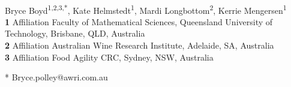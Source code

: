 \documentclass[10pt,letterpaper]{article}
\begin{document}
\vspace*{0.2in}

\begin{flushleft}
{\Large
\textbf{}
}
\newline
\\
Bryce Boyd\textsuperscript{1,2,3,*},
Kate Helmstedt\textsuperscript{1},
Mardi Longbottom\textsuperscript{2},
Kerrie Mengersen\textsuperscript{1}
\\
\bigskip
\textbf{1} Affiliation Faculty of Mathematical Sciences, Queensland University of Technology, Brisbane, QLD, Australia
\\
\textbf{2} Affiliation Australian Wine Research Institute, Adelaide, SA, Australia
\\
\textbf{3} Affiliation Food Agility CRC, Sydney, NSW, Australia
\\
\bigskip

% 
%







* Bryce.polley@awri.com.au

\end{flushleft}
\end{document}
